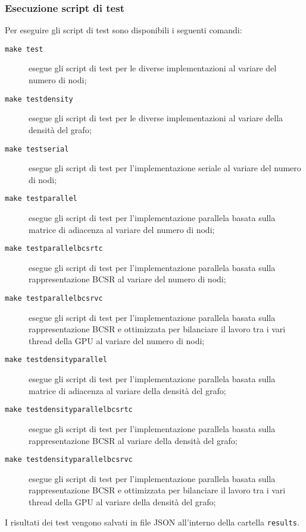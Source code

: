     \subsubsection*{Esecuzione script di test}

        Per eseguire gli script di test sono disponibili i seguenti comandi:
        \begin{description}
            \item[\texttt{make test}] esegue gli script di test per le diverse implementazioni al variare del numero di nodi;
            \item[\texttt{make testdensity}] esegue gli script di test per le diverse implementazioni al variare della densità del grafo;
            \item[\texttt{make testserial}] esegue gli script di test per l'implementazione seriale al variare del numero di nodi;
            \item[\texttt{make testparallel}] esegue gli script di test per l'implementazione parallela basata sulla matrice di adiacenza al variare del numero di nodi;
            \item[\texttt{make testparallelbcsrtc}] esegue gli script di test per l'implementazione parallela basata sulla rappresentazione BCSR al variare del numero di nodi;
            \item[\texttt{make testparallelbcsrvc}] esegue gli script di test per l'implementazione parallela basata sulla rappresentazione BCSR e ottimizzata per bilanciare il lavoro tra i vari thread della GPU al variare del numero di nodi;
            \item[\texttt{make testdensityparallel}] esegue gli script di test per l'implementazione parallela basata sulla matrice di adiacenza al variare della densità del grafo;
            \item[\texttt{make testdensityparallelbcsrtc}] esegue gli script di test per l'implementazione parallela basata sulla rappresentazione BCSR al variare della densità del grafo;
            \item[\texttt{make testdensityparallelbcsrvc}] esegue gli script di test per l'implementazione parallela basata sulla rappresentazione BCSR e ottimizzata per bilanciare il lavoro tra i vari thread della GPU al variare della densità del grafo;
        \end{description}

        I risultati dei test vengono salvati in file JSON all'interno della cartella \texttt{results}.

